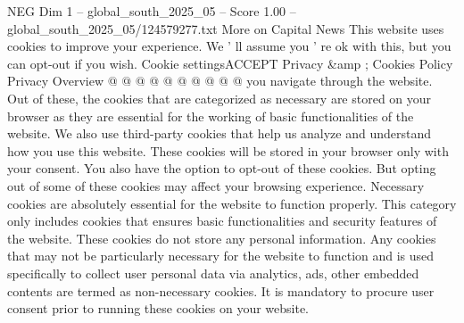 \begin{textsample}{NEG Dim 1 – global\_south\_2025\_05 – Score 1.00 – global\_south\_2025\_05/124579277.txt}
More on Capital News This website uses cookies to improve your experience.
We ' ll assume you ' re ok with this, but you can opt-out if you wish.
Cookie settingsACCEPT Privacy \&amp ; Cookies Policy Privacy Overview @ @ @ @ @ @ @ @ @ @ you navigate through the website.
Out of these, the cookies that are categorized as necessary are stored on your browser as they are essential for the working of basic functionalities of the website.
We also use third-party cookies that help us analyze and understand how you use this website.
These cookies will be stored in your browser only with your consent.
You also have the option to opt-out of these cookies.
But opting out of some of these cookies may affect your browsing experience.
Necessary cookies are absolutely essential for the website to function properly.
This category only includes cookies that ensures basic functionalities and security features of the website.
These cookies do not store any personal information.
Any cookies that may not be particularly necessary for the website to function and is used specifically to collect user personal data via analytics, ads, other embedded contents are termed as non-necessary cookies.
It is mandatory to procure user consent prior to running these cookies on your website.

\end{textsample}
